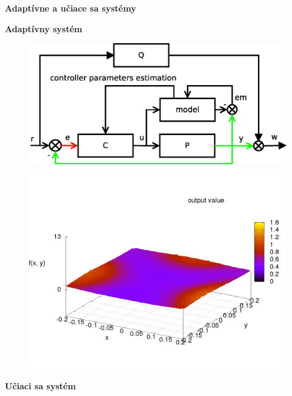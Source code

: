 \documentclass[xcolor=dvipsnames]{beamer}
\begin{document}
\begin{frame}{\bf Adaptívne a učiace sa systémy}

\begin{minipage}{.5\textwidth}
  {\bf Adaptívny systém}

  \begin{figure}[!htb]
  \centering
  \includegraphics[scale=.22]{../diagrams/adaptive_system.eps}
  \label{fig:adaptive_system}
  \end{figure}

  \begin{figure}[!htb]
  \centering
  \includegraphics[scale=.2]{../pictures/function_f1.png}
  \end{figure}

\end{minipage}%
\begin{minipage}{.5\textwidth}

  {\bf Učiaci sa systém}


\end{minipage}
\end{frame}
\end{document}
